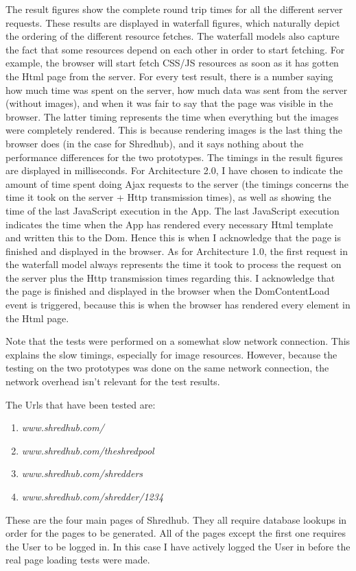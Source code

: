 The result figures show the complete round trip times for all the different server requests. These results are displayed in waterfall figures, which naturally depict the ordering of the different resource fetches. The waterfall models also capture the fact that some resources depend on each other in order to start fetching. For example, the browser will start fetch CSS/JS resources as soon as it has gotten the Html page from the server. For every test result, there is a number saying how much time was spent on the server, how much data was sent from the server (without images), and when it was fair to say that the page was visible in the browser. The latter timing represents the time when everything but the images were completely rendered. This is because rendering images is the last thing the browser does (in the case for Shredhub), and it says nothing about the performance differences for the two prototypes. The timings in the result figures are displayed in milliseconds. For Architecture 2.0, I have chosen to indicate the amount of time spent doing Ajax requests to the server (the timings concerns the time it took on the server + Http transmission times), as well as showing the time of the last JavaScript execution in the App. The last JavaScript execution indicates the time when the App has rendered every necessary Html template and written this to the Dom. Hence this is when I acknowledge that the page is finished and displayed in the browser. As for Architecture 1.0, the first request in the waterfall model always represents the time it took to process the request on the server plus the Http transmission times regarding this. I acknowledge that the page is finished and displayed in the browser when the DomContentLoad event is triggered, because this is when the browser has rendered every element in the Html page. 

 Note that the tests were performed on a somewhat slow network connection. This explains the slow timings, especially for image resources. However, because the testing on the two prototypes was done on the same network connection, the network overhead isn't relevant for the test results. 

The Urls that have been tested are:
\begin{enumerate}
\item \textit{www.shredhub.com/}
\item \textit{www.shredhub.com/theshredpool}
\item \textit{www.shredhub.com/shredders}
\item \textit{www.shredhub.com/shredder/1234}
\end{enumerate}
These are the four main pages of Shredhub. They all require database lookups in order for the pages to be generated. All of the pages except the first one requires the User to be logged in. In this case I have actively logged the User in before the real page loading tests were made. 

